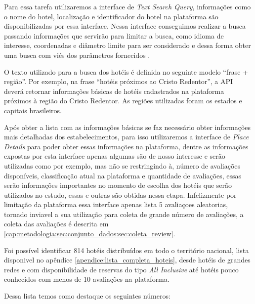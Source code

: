 Para essa tarefa utilizaremos a interface de \emph{Text Search Query}, informações como o nome do hotel, localização e identificador do hotel na plataforma são disponibilizadas por essa interface. Nessa interface conseguimos realizar a busca passando informações que servirão para limitar a busca, como idioma de interesse, coordenadas e diâmetro limite para ser considerado e dessa forma obter uma busca com viés dos parâmetros fornecidos \cite{placesSearchText2023}.



O texto utilizado para a busca dos hotéis é definida no seguinte modelo “frase + região”. Por exemplo, na frase “hotéis próximos ao Cristo Redentor”, a API deverá retornar informações básicas de hotéis cadastrados na plataforma próximos à região do Cristo Redentor. As regiões utilizadas foram os estados e capitais brasileiros.

Após obter a lista com as informações básicas se faz necessário obter informações mais detalhadas dos estabelecimentos, para isso utilizaremos a interface de \emph{Place Details} para poder obter essas informações na plataforma, dentre as informações expostas por esta interface apenas algumas são de nosso interesse e serão utilizadas como por exemplo, mas não se restringindo à, número de avaliações disponíveis, classificação atual na plataforma e quantidade de avaliações, essas serão informações importantes no momento de escolha dos hotéis que serão utilizados no estudo, essas e outras são obtidas nessa etapa. Infelizmente por limitação da plataforma essa interface apenas lista 5 avaliaçoes aleatorias, tornado inviavel a sua utilização para coleta de grande número de avaliações, a coleta das avaliações é descrita em \ref{cap:metodologia:sec:conjunto_dados:sec:coleta_review}.



Foi possível identificar 814 hotéis distribuídos em todo o território nacional, lista disponivel no apêndice \ref{apendice:lista_completa_hoteis}, desde hotéis de grandes redes e com disponibilidade de reservas do tipo \emph{All Inclusive} até hotéis pouco conhecidos com menos de 10 avaliações na plataforma.

Dessa lista temos como destaque os seguintes números:

